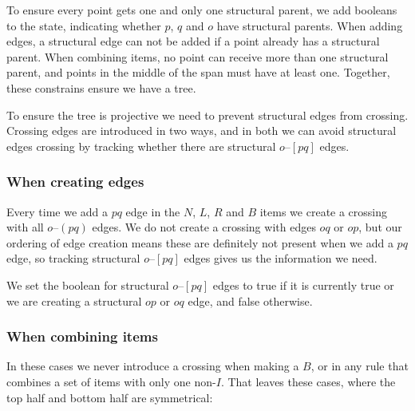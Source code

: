 To ensure every point gets one and only one structural parent, we add booleans to the state, indicating whether $p$, $q$ and $o$ have structural parents.
When adding edges, a structural edge can not be added if a point already has a structural parent.
When combining items, no point can receive more than one structural parent, and points in the middle of the span must have at least one.
Together, these constrains ensure we have a tree.

To ensure the tree is projective we need to prevent structural edges from crossing.
Crossing edges are introduced in two ways, and in both we can avoid structural edges crossing by tracking whether there are structural $o$--$[pq]$ edges.

\subsubsection{When creating edges}
Every time we add a $pq$ edge in the $N$, $L$, $R$ and $B$ items we create a crossing with all $o$--$(pq)$ edges.
We do not create a crossing with edges $oq$ or $op$, but our ordering of edge creation means these are definitely not present when we add a $pq$ edge, so tracking structural $o$--$[pq]$ edges gives us the information we need.

We set the boolean for structural $o$--$[pq]$ edges to true if it is currently true or we are creating a structural $op$ or $oq$ edge, and false otherwise.

\subsubsection{When combining items}
In these cases we never introduce a crossing when making a $B$, or in any rule that combines a set of items with only one non-$I$.
That leaves these cases, where the top half and bottom half are symmetrical:


